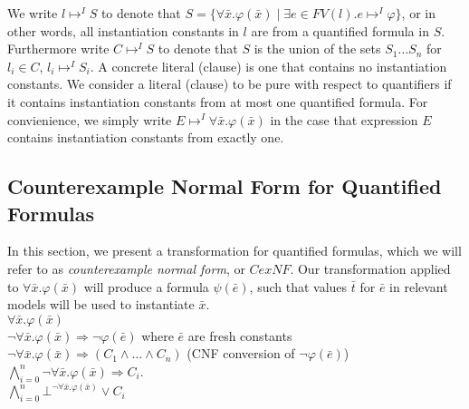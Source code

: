 \documentclass{llncs}
\begin{document}

We write $l \mapsto^I S$ to denote that $S = \{ \forall \bar{x}. \varphi( \bar{x} ) \mid \exists e \in FV( l ). e \mapsto^I \varphi \}$, or in other words, all instantiation constants in $l$ are from a quantified formula in $S$.
Furthermore write $C \mapsto^I S$ to denote that $S$ is the union of the sets $S_1 \ldots S_n$ for $l_i \in C$, $l_i \mapsto^I S_i$.
A concrete literal (clause) is one that contains no instantiation constants.
We consider a literal (clause) to be pure with respect to quantifiers if it contains instantiation constants from at most one quantified formula.
For convienience, we simply write $E \mapsto^I \forall \bar{x}. \varphi( \bar{x} )$ in the case that expression $E$ contains instantiation constants from exactly one.

\subsection{Counterexample Normal Form for Quantified Formulas}
\label{sec:CENF}

In this section, we present a transformation for quantified formulas, which we will refer to as \emph{counterexample normal form}, or $CexNF$.
Our transformation applied to $\forall \bar{x}. \varphi( \bar{ x } )$ will produce a formula $\psi( \bar{e} )$, such that values $\bar{t}$ for $\bar{e}$ in relevant models will be used to instantiate $\bar{x}$. \\

\noindent $\forall \bar{x}. \varphi( \bar{ x } )$ \\
$\neg \forall \bar{x}. \varphi( \bar{ x } ) \Rightarrow \neg \varphi( \bar{e} )$  where $\bar{e}$ are fresh constants \\
$\neg \forall \bar{x}. \varphi( \bar{ x } ) \Rightarrow (C_1 \wedge \ldots \wedge C_n )$ (CNF conversion of $\neg \varphi( \bar{ e } )$) \\
$\displaystyle\bigwedge\limits_{i=0}^n \neg \forall \bar{x}. \varphi( \bar{ x } ) \Rightarrow C_i$. \\
$\displaystyle\bigwedge\limits_{i=0}^n \bot^{\neg \forall \bar{x}. \varphi( \bar{ x } )} \vee C_i$ \\
\end{document}
